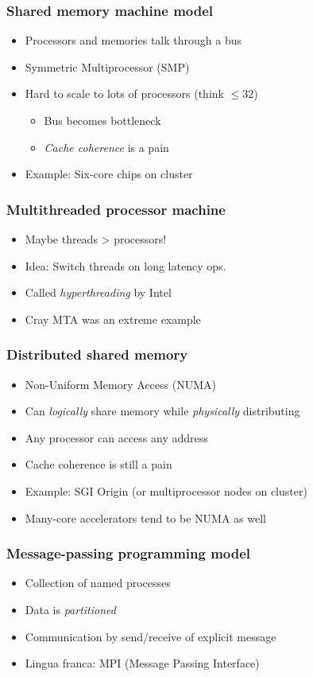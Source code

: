 \documentclass{beamer}
\begin{document}
\begin{frame}
  \frametitle{Shared memory machine model}

  \begin{itemize}
  \item Processors and memories talk through a bus
  \item Symmetric Multiprocessor (SMP)
  \item Hard to scale to lots of processors (think $\leq 32$)
    \begin{itemize}
      \item Bus becomes bottleneck
      \item {\em Cache coherence} is a pain
    \end{itemize}
  \item Example: Six-core chips on cluster
  \end{itemize}
\end{frame}


\begin{frame}
  \frametitle{Multithreaded processor machine}
  
  \begin{itemize}
  \item Maybe threads > processors!
  \item Idea: Switch threads on long latency ops.
  \item Called {\em hyperthreading} by Intel
  \item Cray MTA was an extreme example
  \end{itemize}
\end{frame}


\begin{frame}
  \frametitle{Distributed shared memory}
 
  \begin{itemize}
  \item Non-Uniform Memory Access (NUMA)
  \item Can {\em logically} share memory while {\em physically} distributing
  \item Any processor can access any address
  \item Cache coherence is still a pain
  \item Example: SGI Origin (or multiprocessor nodes on cluster)
  \item Many-core accelerators tend to be NUMA as well
  \end{itemize}
\end{frame}


\begin{frame}
  \frametitle{Message-passing programming model}

  \begin{itemize}
  \item Collection of named processes
  \item Data is {\em partitioned}
  \item Communication by send/receive of explicit message
  \item Lingua franca: MPI (Message Passing Interface)
  \end{itemize}
\end{frame}
\end{document}
